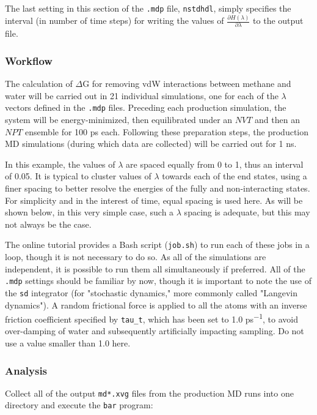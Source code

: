 \documentclass[9pt,tutorial]{livecoms}
\begin{document}
The last setting in this section of the \texttt{.mdp} file, \texttt{nstdhdl}, simply specifies the interval (in number of time steps) for writing the values of $\frac{\partial H(\lambda)}{\partial \lambda}$ to the output file.

\subsubsection{Workflow} \label{fes_workflow}

The calculation of $\Delta$G for removing vdW interactions between methane and water will be carried out in 21 individual simulations, one for each of the $\lambda$ vectors defined in the \texttt{.mdp} files. Preceding each production simulation, the system will be energy-minimized, then equilibrated under an $NVT$ and then an $NPT$ ensemble for 100 ps each. Following these preparation steps, the production MD simulations (during which data are collected) will be carried out for 1 ns.

In this example, the values of $\lambda$ are spaced equally from 0 to 1, thus an interval of 0.05. It is typical to cluster values of $\lambda$ towards each of the end states, using a finer spacing to better resolve the energies of the fully and non-interacting states. For simplicity and in the interest of time, equal spacing is used here. As will be shown below, in this very simple case, such a $\lambda$ spacing is adequate, but this may not always be the case.

The online tutorial provides a Bash script (\texttt{job.sh}) to run each of these jobs in a loop, though it is not necessary to do so. As all of the simulations are independent, it is possible to run them all simultaneously if preferred. All of the \texttt{.mdp} settings should be familiar by now, though it is important to note the use of the \texttt{sd} integrator (for "stochastic dynamics," more commonly called "Langevin dynamics"). A random frictional force is applied to all the atoms with an inverse friction coefficient specified by \texttt{tau\_t}, which has been set to 1.0 ps\textsuperscript{$-$1}, to avoid over-damping of water and subsequently artificially impacting sampling. Do not use a value smaller than 1.0 here.

\subsubsection{Analysis} \label{fes_ana}

Collect all of the output \texttt{md*.xvg} files from the production MD runs into one directory and execute the \texttt{bar} program:
\end{document}
